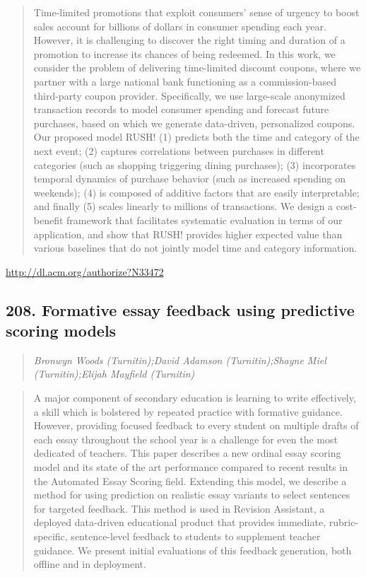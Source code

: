\documentclass{article}
\begin{document}
\begin{quote}
Time-limited promotions that exploit consumers’ sense of urgency to boost sales account for billions of dollars in consumer spending each year. However, it is challenging to discover the right timing and duration of a promotion to increase its chances of being redeemed. In this work, we consider the problem of delivering time-limited discount coupons, where we partner with a large national bank functioning as a commission-based third-party coupon provider. Specifically, we use large-scale anonymized transaction records to model consumer spending and forecast future purchases, based on which we generate data-driven, personalized coupons. Our proposed model RUSH! (1) predicts both the time and category of the next event; (2) captures correlations between purchases in different categories (such as shopping triggering dining purchases); (3) incorporates temporal dynamics of purchase behavior (such as increased spending on weekends); (4) is composed of additive factors that are easily interpretable; and finally (5) scales linearly to millions of transactions. We design a cost-benefit framework that facilitates systematic evaluation in terms of our application, and show that RUSH! provides higher expected value than various baselines that do not jointly model time and category information.
\end{quote}

\href{http://dl.acm.org/authorize?N33472}{http://dl.acm.org/authorize?N33472}

\subsection{208. Formative essay feedback using predictive scoring models}

\begin{quote}
\footnotesize{\textit{Bronwyn Woods (Turnitin);David Adamson (Turnitin);Shayne Miel (Turnitin);Elijah Mayfield (Turnitin)}}

\end{quote}

\begin{quote}
A major component of secondary education is learning to write effectively, a skill which is bolstered by repeated practice with formative guidance. However, providing focused feedback to every student on multiple drafts of each essay throughout the school year is a challenge for even the most dedicated of teachers. This paper describes a new ordinal essay scoring model and its state of the art performance compared to recent results in the Automated Essay Scoring field. Extending this model, we describe a method for using prediction on realistic essay variants to select sentences for targeted feedback. This method is used in Revision Assistant, a deployed data-driven educational product that provides immediate, rubric-specific, sentence-level feedback to students to supplement teacher guidance. We present initial evaluations of this feedback generation, both offline and in deployment.
\end{quote}
\end{document}
